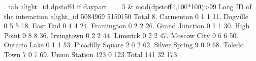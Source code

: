 . tab alight_id dpstoff4 if daypart == 5 \& mod(dpstoff4,100*100)>99
{\smallskip}
                      {\VBAR}    Long ID of the
                      {\VBAR}      interaction
            alight_id {\VBAR}   5084969    5150150 {\VBAR}     Total
         8. Carmenton {\VBAR}         0          1 {\VBAR}         1 
         11. Dogville {\VBAR}         0          5 {\VBAR}         5 
         18. East End {\VBAR}         0          4 {\VBAR}         4 
       24. Framington {\VBAR}         0          2 {\VBAR}         2 
   26. Grand Junction {\VBAR}         0          1 {\VBAR}         1 
       30. High Point {\VBAR}         0          8 {\VBAR}         8 
       36. Irvingtown {\VBAR}         0          2 {\VBAR}         2 
         44. Limerick {\VBAR}         0          2 {\VBAR}         2 
      47. Moscow City {\VBAR}         0          6 {\VBAR}         6 
     50. Ontario Lake {\VBAR}         0          1 {\VBAR}         1 
 53. Picadilly Square {\VBAR}         2          0 {\VBAR}         2 
    62. Silver Spring {\VBAR}         9          0 {\VBAR}         9 
      68. Toledo Town {\VBAR}         7          0 {\VBAR}         7 
    69. Union Station {\VBAR}       123          0 {\VBAR}       123 
                Total {\VBAR}       141         32 {\VBAR}       173 
{\smallskip}
{\smallskip}
